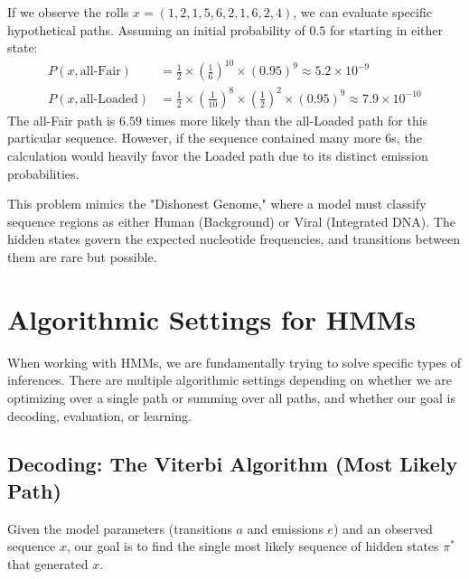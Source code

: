 If we observe the rolls $x = (1, 2, 1, 5, 6, 2, 1, 6, 2, 4)$, we can evaluate specific hypothetical paths. Assuming an initial probability of $0.5$ for starting in either state:
\begin{align*}
  P(x, \text{all-Fair}) &= \frac{1}{2} \times \left(\frac{1}{6}\right)^{10} \times (0.95)^9 \approx 5.2 \times 10^{-9} \\
  P(x, \text{all-Loaded}) &= \frac{1}{2} \times \left(\frac{1}{10}\right)^8 \times \left(\frac{1}{2}\right)^2 \times (0.95)^9 \approx 7.9 \times 10^{-10}
\end{align*}
The all-Fair path is $6.59$ times more likely than the all-Loaded path for this particular sequence. However, if the sequence contained many more $6$s, the calculation would heavily favor the Loaded path due to its distinct emission probabilities.

This problem mimics the "Dishonest Genome," where a model must classify sequence regions as either Human (Background) or Viral (Integrated DNA). The hidden states govern the expected nucleotide frequencies, and transitions between them are rare but possible.


\section{Algorithmic Settings for HMMs}

When working with HMMs, we are fundamentally trying to solve specific types of inferences. There are multiple algorithmic settings depending on whether we are optimizing over a single path or summing over all paths, and whether our goal is decoding, evaluation, or learning.

\subsection{Decoding: The Viterbi Algorithm (Most Likely Path)}

Given the model parameters (transitions $a$ and emissions $e$) and an observed sequence $x$, our goal is to find the single most likely sequence of hidden states $\pi^*$ that generated $x$.

